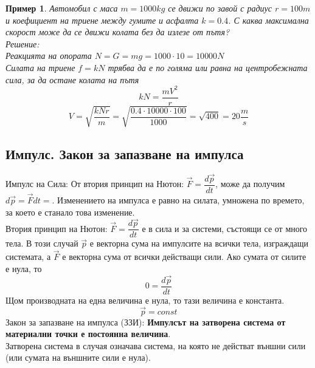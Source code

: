 \documentclass[fleqn]{article}
\newtheorem{example}{Пример}[subsection]
\begin{document}
\begin{example}
Автомобил с маса $m = 1000 kg$ се движи по завой с радиус $r = 100 m$ и коефициент на триене между гумите и асфалта $k =0.4$. С каква максимална скорост може да се движи колата без да излезе от пътя?\\
Решение: \\
Реакцията на опората $N = G = mg = 1000 \cdot 10 = 10 000 N$\\
Силата на триене $f = kN$ трябва да е по голяма или равна на центробежната сила, за да остане колата на пътя 
$$kN =  \dfrac{mV^2}{r}$$
$$V = \sqrt{\dfrac{kNr}{m}} = \sqrt{\dfrac{0.4 \cdot 10 000 \cdot 100}{1000}} = \sqrt{400} = 20 \dfrac{m}{s}$$
\end{example}


\subsection{Импулс. Закон за запазване на импулса}

Импулс на Сила: От втория принцип на Нютон: $\vec{F} = \dfrac{d \vec{p}}{dt}$, може да получим $d \vec{p} =\vec{F}dt =$. Изменението на импулса е равно на силата, умножена по времето, за което е станало това изменение. \\
Втория принцип на Нютон: $\vec{F} = \dfrac{d \vec{p}}{dt}$ е в сила и за системи, състоящи се от много тела. В този случай $\vec{p}$ е векторна сума на импулсите на всички тела, изграждащи системата, а $\vec{F}$ е векторна сума от всички действащи сили. Ако сумата от силите е нула, то
$$0 = \dfrac{d \vec{p}}{dt}$$
Щом производната на една величина е нула, то тази величина е константа.
$$\vec{p} = const$$
Закон за запазване на импулса (ЗЗИ): \textbf{Импулсът на затворена система от материални точки е постоянна величина}.\\ 
Затворена система в случая означава система, на която не действат външни сили (или сумата на външните сили е нула).
\end{document}
